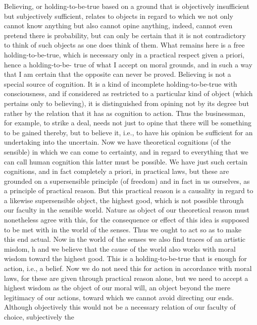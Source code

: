 Believing, or holding-to-be-true based on a ground that is
objectively insufficient but subjectively sufficient, relates to objects in
regard to which we not only cannot know anything but also cannot opine
anything, indeed, cannot even pretend there is probability, but can only be
certain that it is not contradictory to think of such objects as one does
think of them. What remains here is a free holding-to-be-true, which is
necessary only in a practical respect given a priori, hence a holding-to-be-
true of what I accept on moral grounds, and in such a way that I am certain
that the opposite can never be proved.
Believing is not a special source of cognition. It is a kind of incomplete holding-to-be-true
with consciousness, and if considered as restricted to a particular kind of object (which
pertains only to believing), it is distinguished from opining not by its degree but rather by the
relation that it has as cognition to action. Thus the businessman, for example, to strike a
deal, needs not just to opine that there will be something to be gained thereby, but to believe
it, i.e., to have his opinion be sufficient for an undertaking into the uncertain. Now we have
theoretical cognitions (of the sensible) in which we can come to certainty, and in regard to
everything that we can call human cognition this latter must be possible. We have just such
certain cognitions, and in fact completely a priori, in practical laws, but these are grounded
on a supersensible principle (of freedom) and in fact in us ourselves, as a principle of practical
reason. But this practical reason is a causality in regard to a likewise supersensible object, the
highest good, which is not possible through our faculty in the sensible world. Nature as object
of our theoretical reason must nonetheless agree with this, for the consequence or effect of this
idea is supposed to be met with in the world of the senses. Thus we ought to act so as to
make this end actual.
Now in the world of the senses we also find traces of an artistic misdom, h and we believe
that the cause of the world also works with moral wisdom toward the highest good. This is a
holding-to-be-true that is enough for action, i.e., a belief. Now we do not need this for action
in accordance with moral laws, for these are given through practical reason alone, but we
need to accept a highest wisdom as the object of our moral will, an object beyond the mere
legitimacy of our actions, toward which we cannot avoid directing our ends. Although
objectively this would not be a necessary relation of our faculty of choice, subjectively the
